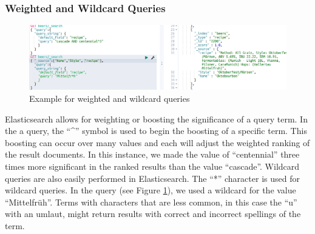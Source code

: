 \documentclass[bibliography=totoc]{article}
\begin{document}
\subsubsection{Weighted and Wildcard Queries}
\begin{figure}
    \includegraphics[height=0.3\textwidth]{beer_wildcard.png}
    \caption{\label{beer_wildcard}Example for weighted and wildcard queries} 
 \end{figure}
Elasticsearch allows for weighting or boosting the significance of 
a query term. In the a query, the “\^{}” symbol is used to begin the 
boosting of a specific term. This boosting can occur over many 
values and each will adjust the weighted ranking of the result documents. In this instance, we made the value of “centennial” three times more significant in the ranked results than the value “cascade”. 
Wildcard queries are also easily performed in Elasticsearch. 
The “*” character is used for wildcard queries. In the query (see Figure \ref{beer_wildcard}), 
we used a wildcard for the value “Mittelfrüh”. 
Terms with characters that are less common, in this case the “u” with 
an umlaut, might return results with correct and incorrect spellings 
of the term. 
 
\end{document}

